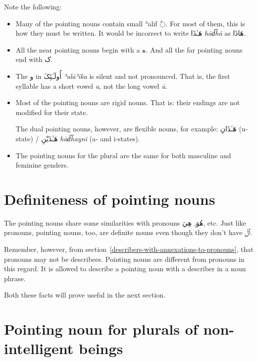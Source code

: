 \documentclass[
  10pt,
]{book}
\begin{document}
Note the following:

\begin{itemize}
\item
  Many of the pointing nouns contain small ʾalif \foreignlanguage{arabic}{◌ٰ}. For most of them, this is how they must be written. It would be incorrect to write \foreignlanguage{arabic}{هَـٰذَا} \emph{hād͡hā} as \foreignlanguage{arabic}{هَاذَا}.
\item
  All the near pointing nouns begin with a \foreignlanguage{arabic}{ه}. And all the far pointing nouns end with \foreignlanguage{arabic}{ک}.
\item
  The \foreignlanguage{arabic}{و} in \foreignlanguage{arabic}{أُولَـٰئِکَ} \emph{ʾulāʾika} is silent and not pronounced. That is, the first syllable has a short vowel \emph{u}, not the long vowel \emph{ū}.
\item
  Most of the pointing nouns are rigid nouns. That is: their endings are not modified for their state.

  The dual pointing nouns, however, are flexible nouns, for example: \foreignlanguage{arabic}{هَـٰذَانِ} (u-state) / \foreignlanguage{arabic}{هَـٰذَيْنِ} \emph{hād͡hayni} (a- and i-states).
\item
  The pointing nouns for the plural are the same for both masculine and feminine genders.
\end{itemize}

\section{Definiteness of pointing nouns}\label{definiteness-of-pointing-nouns}

The pointing nouns share some similarities with pronouns \foreignlanguage{arabic}{هُوَ}, \foreignlanguage{arabic}{هِيَ}, etc. Just like pronouns, pointing nouns, too, are definite nouns even though they don't have \foreignlanguage{arabic}{ٱَلْ}.

Remember, however, from section~\ref{describers-with-annexations-to-pronouns}, that pronouns may not be describees.
Pointing nouns are different from pronouns in this regard. It is allowed to describe a pointing noun with a describer in a noun phrase.

Both these facts will prove useful in the next section.

\section{Pointing noun for plurals of non-intelligent beings}\label{pointing-noun-for-plurals-of-non-intelligent-beings}
\end{document}
